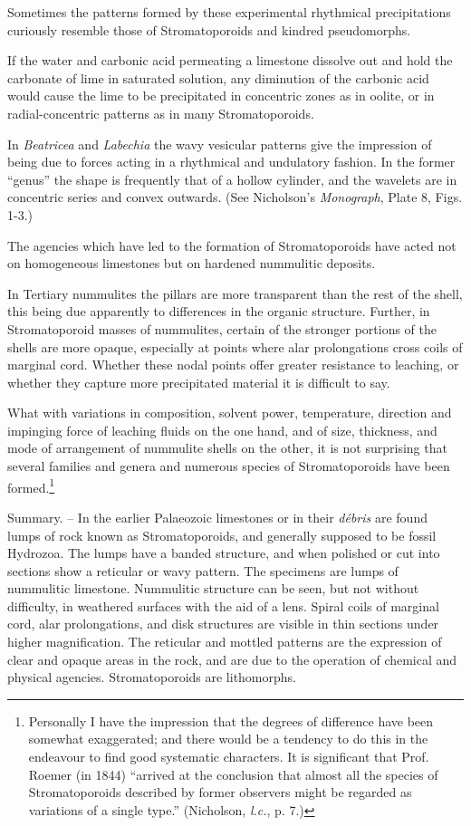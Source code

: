 \documentclass[a4paper, 12pt, oneside]{article}
\begin{document}
Sometimes the patterns formed by these experimental rhythmical precipitations curiously resemble those of Stromatoporoids and kindred pseudomorphs.

If the water and carbonic acid permeating a limestone dissolve out and hold the carbonate of lime in saturated solution, any diminution of the carbonic acid would cause the lime to be precipitated in concentric zones as in oolite, or in radial-concentric patterns as in many Stromatoporoids.

In \emph{Beatricea} and \emph{Labechia} the wavy vesicular patterns give the impression of being due to forces acting in a rhythmical and undulatory fashion. In the former ``genus'' the shape is frequently that of a hollow cylinder, and the wavelets are in concentric series and convex outwards. (See Nicholson's \emph{Monograph}, Plate 8, Figs. 1-3.)

The agencies which have led to the formation of Stromatoporoids have acted not on homogeneous limestones but on hardened nummulitic deposits.

In Tertiary nummulites the pillars are more transparent than the rest of the shell, this being due apparently to differences in the organic structure. Further, in Stromatoporoid masses of nummulites, certain of the stronger portions of the shells are more opaque, especially at points where alar prolongations cross coils of marginal cord. Whether these nodal points offer greater resistance to leaching, or whether they capture more precipitated material it is difficult to say.

What with variations in composition, solvent power, temperature, direction and impinging force of leaching fluids on the one hand, and of size, thickness, and mode of arrangement of nummulite shells on the other, it is not surprising that several families and genera and numerous species of Stromatoporoids have been formed.\footnote{Personally I have the impression that the degrees of difference have been somewhat exaggerated; and there would be a tendency to do this in the endeavour to find good systematic characters. It is significant that Prof. Roemer (in 1844) ``arrived at the conclusion that almost all the species of Stromatoporoids described by former observers might be regarded as variations of a single type.'' (Nicholson, \emph{l.c.}, p. 7.)}

Summary. -- In the earlier Palaeozoic limestones or in their \emph{débris} are found lumps of rock known as Stromatoporoids, and generally supposed to be fossil Hydrozoa. The lumps have a banded structure, and when polished or cut into sections show a reticular or wavy pattern. The specimens are lumps of nummulitic limestone. Nummulitic structure can be seen, but not without difficulty, in weathered surfaces with the aid of a lens. Spiral coils of marginal cord, alar prolongations, and disk structures are visible in thin sections under higher magnification. The reticular and mottled patterns are the expression of clear and opaque areas in the rock, and are due to the operation of chemical and physical agencies. Stromatoporoids are lithomorphs.
\end{document}
